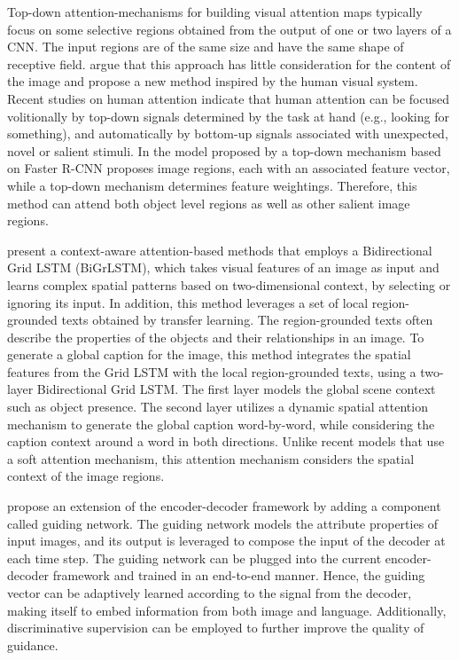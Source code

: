 Top-down attention-mechanisms for building visual attention maps typically focus on some selective regions obtained from the output of one or two layers of a CNN. The input regions are of the same size and have the same shape of receptive field. \citet{Anderson2018_BUTD} argue that this approach has little consideration for the content  of the image and propose a new method inspired by the human visual system. Recent studies on human attention \citep{Buschman2007} indicate that human attention can be focused volitionally by top-down signals determined by the task at hand (e.g., looking for something), and automatically by bottom-up signals associated with unexpected, novel or salient stimuli. In the model proposed by \citeauthor{} a top-down mechanism based on Faster R-CNN \citet{Ren2015} proposes image regions, each with an associated feature vector, while a top-down mechanism determines feature weightings. Therefore, this method can attend both object level regions as well as other salient image regions. 

\citet{Khademi2018} present a context-aware attention-based methods that employs a Bidirectional Grid LSTM (BiGrLSTM), which takes visual features of an image as input and learns complex spatial patterns based on two-dimensional context, by selecting or ignoring its input. In addition, this method leverages a set of local region-grounded texts obtained by transfer learning. The region-grounded texts often describe the properties of the objects and their relationships in an image. To generate a global caption for the image, this method integrates the spatial features from the Grid LSTM with the local region-grounded texts, using a two-layer Bidirectional Grid LSTM. The first layer models the global scene context such as object presence. The second layer utilizes a dynamic spatial attention mechanism to generate the global caption word-by-word, while considering the caption context around a word in both directions. Unlike recent models that use a soft attention mechanism, this attention mechanism considers the spatial context of the image regions.

\citet{Jiang2018} propose an extension of the encoder-decoder framework by adding a component called guiding network. The guiding network models the attribute properties of input images, and its output is leveraged to compose the input of the decoder at each time step. The guiding network can be plugged into the current encoder-decoder framework and trained in an end-to-end manner. Hence, the guiding vector can be adaptively learned according to the signal from the decoder, making itself to embed information from both image and language. Additionally, discriminative supervision can be employed to further improve the quality of guidance.

